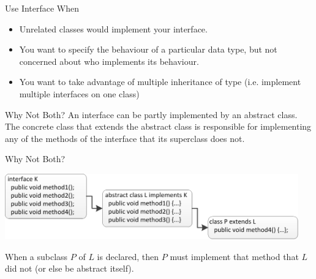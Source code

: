 \documentclass[aspectratio=169]{beamer}
\begin{document}
\begin{frame}{Use Interface When}
\begin{itemize}
\item Unrelated classes would implement your interface. 
\item You want to specify the behaviour of a particular data type, but not concerned about who implements its behaviour.
\item You want to take advantage of multiple inheritance of type (i.e. implement multiple interfaces on one class)
\end{itemize}
\end{frame}



\begin{frame}{Why Not Both?}
An interface can be partly implemented by an abstract class. \\
\vspace{1em}
The concrete class that extends the abstract class is responsible for implementing any of the methods of the interface that its superclass does not. \\
\end{frame}



\begin{frame}{Why Not Both?}
\begin{center}
\includegraphics[width=0.95\textwidth]{img/KLP.png} 
\end{center}

\vspace{1em}
When a subclass $P$ of $L$ is declared, then $P$ must implement that method that $L$ did not (or else be abstract itself). \\
\end{frame}
\end{document}
